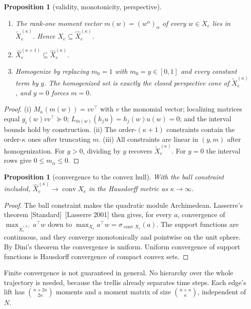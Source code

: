 \documentclass[11pt]{article}
\newcommand{\conv}{\operatorname{conv}}
\newcommand{\std}{\textcolor{muted}{[Standard]}\ }
\theoremstyle{plain}
\newtheorem{proposition}[theorem]{Proposition}
\theoremstyle{definition}
\theoremstyle{remark}
\begin{document}
\begin{proposition}[validity, monotonicity, perspective]\label{prop:moment}
\begin{enumerate}[label=(\roman*),leftmargin=1.6em]
  \item The rank-one moment vector $m(w)=(w^\alpha)_\alpha$ of every $w\in X_e$ lies in $\tilde X_e^{(\kappa)}$. Hence $X_e\subseteq\hat X_e^{(\kappa)}$.
  \item $\hat X_e^{(\kappa+1)}\subseteq\hat X_e^{(\kappa)}$.
  \item Homogenize by replacing $m_0=1$ with $m_0=y\in[0,1]$ and every constant term by $y$. The homogenized set is exactly the closed perspective cone of $\tilde X_e^{(\kappa)}$, and $y=0$ forces $m=0$.
\end{enumerate}
\end{proposition}
\begin{proof}
(i) $M_\kappa(m(w))=vv^\top$ with $v$ the monomial vector; localizing matrices equal $g_i(w)vv^\top\succeq0$; $L_{m(w)}(h_ju)=h_j(w)u(w)=0$; and the interval bounds hold by construction. (ii) The order-$(\kappa+1)$ constraints contain the order-$\kappa$ ones after truncating $m$. (iii) All constraints are linear in $(y,m)$ after homogenization. For $y>0$, dividing by $y$ recovers $\tilde X^{(\kappa)}_e$. For $y=0$ the interval rows give $0\le m_\alpha\le0$.
\end{proof}

\begin{proposition}[convergence to the convex hull]\label{prop:lasserre}
With the ball constraint included, $\hat X_e^{(\kappa)}\to\conv X_e$ in the Hausdorff metric as $\kappa\to\infty$.
\end{proposition}
\begin{proof}
The ball constraint makes the quadratic module Archimedean. Lasserre's theorem \std[Lasserre 2001] then gives, for every $a$, convergence of $\max_{\hat X^{(\kappa)}_e}a^\top w$ down to $\max_{X_e}a^\top w=\sigma_{\conv X_e}(a)$. The support functions are continuous, and they converge monotonically and pointwise on the unit sphere. By Dini's theorem the convergence is uniform. Uniform convergence of support functions is Hausdorff convergence of compact convex sets.
\end{proof}
Finite convergence is not guaranteed in general. No hierarchy over the whole trajectory is needed, because the trellis already separates time steps. Each edge's lift has $\binom{n+2\kappa}{2\kappa}$ moments and a moment matrix of size $\binom{n+\kappa}{\kappa}$, independent of $N$.
\end{document}
